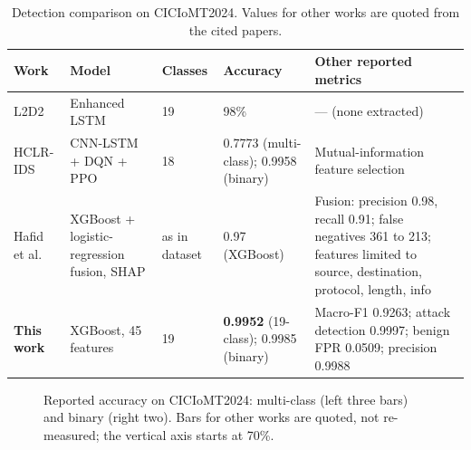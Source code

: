 \documentclass[preprint,12pt]{elsarticle}
\begin{document}
\begin{table}[htbp]
\centering
\caption{Detection comparison on CICIoMT2024. Values for other works are quoted from the cited papers.}
\label{tab:cmpdet}
\small
\begin{tabular}{@{}L{2.4cm}L{2.8cm}C{1.2cm}C{2.4cm}L{3.8cm}@{}}
\toprule
Work & Model & Classes & Accuracy & Other reported metrics \\
\midrule
L2D2~\cite{akar2025} & Enhanced LSTM & 19 & 98\% & --- (none extracted) \\
HCLR-IDS~\cite{shaikh2025} & CNN-LSTM + DQN + PPO & 18 & 0.7773 (multi-class); 0.9958 (binary) & Mutual-information feature selection \\
Hafid et al.~\cite{hafid2025} & XGBoost + logistic-regression fusion, SHAP & as in dataset & 0.97 (XGBoost) & Fusion: precision 0.98, recall 0.91; false negatives 361 to 213; features limited to source, destination, protocol, length, info \\
\textbf{This work} & XGBoost, 45 features & 19 & \textbf{0.9952} (19-class); 0.9985 (binary) & Macro-F1 0.9263; attack detection 0.9997; benign FPR 0.0509; precision 0.9988 \\
\bottomrule
\end{tabular}
\end{table}

\begin{figure}[htbp]
\centering
{}
\caption{Reported accuracy on CICIoMT2024: multi-class (left three bars) and binary (right two). Bars for other works are quoted, not re-measured; the vertical axis starts at 70\%.}
\label{fig:cmpdet}
\end{figure}
\end{document}
